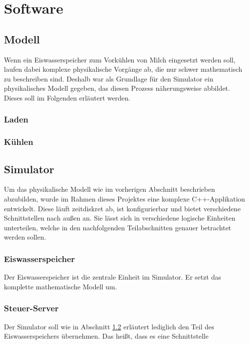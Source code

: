 \chapter{Software}

\section{Modell}

Wenn ein Eiswasserspeicher zum Vorkühlen von Milch eingesetzt werden soll, laufen dabei komplexe physikalische Vorgänge ab, die nur schwer mathematisch zu beschreiben sind. Deshalb war als Grundlage für den Simulator ein physikalisches Modell gegeben, das diesen Prozess näherungsweise abbildet. Dieses soll im Folgenden erläutert werden. %

\subsection{Laden}

\subsection{Kühlen}

\section{Simulator}
\label{software_simulator}

Um das physikalische Modell wie im vorherigen Abschnitt beschrieben abzubilden, wurde im Rahmen dieses Projektes eine komplexe C++-Applikation entwickelt. Diese läuft zeitdiskret ab, ist konfigurierbar und bietet verschiedene Schnittstellen nach außen an. Sie lässt sich in verschiedene logische Einheiten unterteilen, welche in den nachfolgenden Teilabschnitten genauer betrachtet werden sollen. %

\subsection{Eiswasserspeicher}

Der Eiswasserspeicher ist die zentrale Einheit im Simulator. Er setzt das komplette mathematische Modell um. %

\subsection{Steuer-Server}
Der Simulator soll wie in Abschnitt \ref{software_simulator} erläutert lediglich den Teil des Eiswasserspeichers übernehmen. Das heißt, dass es eine Schnittstelle  %

